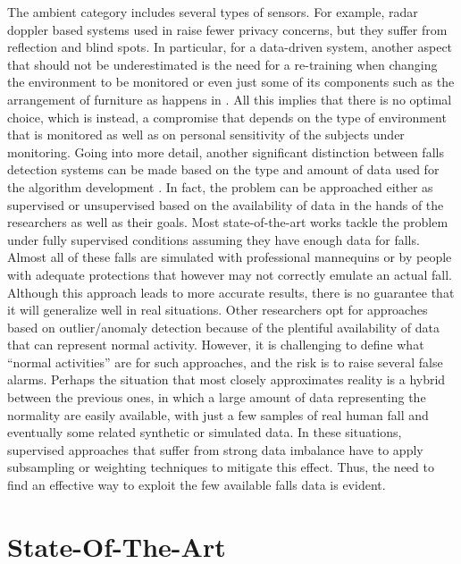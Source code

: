 The ambient category includes several types of sensors. For example, radar doppler based systems used in \cite{wu2015radar} raise fewer privacy concerns, but they suffer from reflection and blind spots. In particular, for a data-driven system, another aspect that should not be underestimated is the need for a re-training when changing the environment to be monitored or even just some of its components such as the arrangement of furniture as happens in \cite{liu2008vision}.
All this implies that there is no optimal choice, which is instead, a compromise that depends on the type of environment that is monitored as well as on personal sensitivity of the subjects under monitoring.
Going into more detail, another significant distinction between falls detection systems can be made based on the type and amount of data used for the algorithm development \cite{khan2017review}. In fact, the problem can be approached either as supervised or unsupervised based on the availability of data in the hands of the researchers as well as their goals. 
Most state-of-the-art works tackle the problem under fully supervised conditions assuming they have enough data for falls. Almost all of these falls are simulated with professional mannequins \cite{werner2011fall, zigel2009method}  or by people with adequate protections \cite{li2012microphone, popescu2008acoustic} that however may not correctly emulate an actual fall. Although this approach leads to more accurate results, there is no guarantee that it will generalize well in real situations. 
Other researchers opt for approaches based on outlier/anomaly detection \cite{khan2015unsupervised, zhang2009detecting, popescu2009acoustic} because of the plentiful availability of data that can represent normal activity. However, it is challenging to define what ``normal activities'' are for such approaches, and the risk is to raise several false alarms. %
Perhaps the situation that most closely approximates reality is a hybrid between the previous ones, in which a large amount of data representing the normality are easily available, with just a few samples of real human fall and eventually some related synthetic or simulated data. In these situations, supervised approaches that suffer from strong data imbalance have to apply subsampling \cite{stone2015fall} or weighting \cite{khan2017review} techniques to mitigate this effect. Thus, the need to find an effective way to exploit the few available falls data is evident.

\section{State-Of-The-Art} 
\label{sec:soa}

